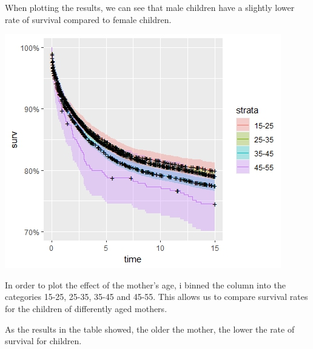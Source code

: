 \documentclass[12pt,letterpaper]{article}
\begin{document}
When plotting the results, we can see that male children have a slightly lower rate of survival compared to female children.

\begin{center}
	\includegraphics{m.age}
\end{center}

In order to plot the effect of the mother's age, i binned the column into the categories 15-25, 25-35, 35-45 and 45-55. This allows us to compare survival rates for the children of differently aged mothers.

	 

As the results in the table showed, the older the mother, the lower the rate of survival for children.
\end{document}
